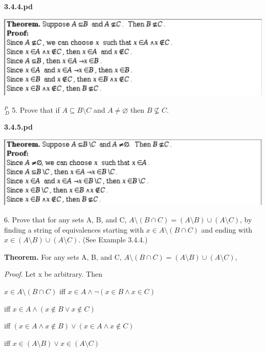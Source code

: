 \documentclass{article}
\begin{document}
\textbf{3.4.4.pd}
\vspace{10pt}

\includegraphics[width=\textwidth]{3_4_4}

\vspace{30pt}

$^{\textit{P}}_{\, \textit{D}}$ 5. Prove that if $A \subseteq B \setminus C$ and $A \neq \varnothing$ then $B \nsubseteq C$.
\vspace{30pt}

\textbf{3.4.5.pd}
\vspace{10pt}

\includegraphics[width=\textwidth]{3_4_5}

\vspace{30pt}

6. Prove that for any sets A, B, and C, $A \setminus (B \cap C) = (A \setminus B) \cup (A \setminus C)$,
by finding a string of equivalences starting with $x \in A \setminus (B \cap C)$ and
ending with $x \in (A \setminus B) \cup (A \setminus C)$. (See Example 3.4.4.)
\vspace{30pt}

\textbf{Theorem.} For any sets A, B, and C, $A \setminus (B \cap C) = (A \setminus B) \cup (A \setminus C)$,

\textit{Proof.} Let x be arbitrary. Then

$x \in A \setminus (B \cap C)$ iff $x \in A \land \neg (x \in B \land x \in C)$

\quad \quad \quad \quad \quad \quad \quad iff $x \in A \land (x \notin B \lor x \notin C)$

\quad \quad \quad \quad \quad \quad \quad iff $(x \in A \land x \notin B) \lor (x \in A \land x \notin C)$

\quad \quad \quad \quad \quad \quad \quad iff $x \in (A \setminus B) \lor x \in (A \setminus C)$
\end{document}
